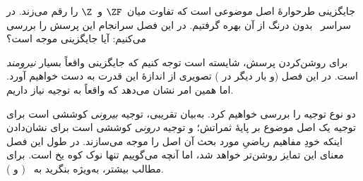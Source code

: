 \documentclass[../../../include/open-logic-section]{subfiles}
\begin{document}

جایگزینی طرحوارهٔ اصل موضوعی است که تفاوت میان~$\ZF$ و~$\Z$ را رقم
می‌زند. در سراسر~ بدون
درنگ از آن بهره گرفتیم. در این فصل سرانجام این پرسش را بررسی می‌کنیم:
آیا جایگزینی موجه است؟

برای روشن‌کردن پرسش، شایسته است توجه کنیم که جایگزینی واقعاً بسیار
\emph{نیرومند} است. در این فصل (و بار دیگر در
) تصویری از اندازهٔ این قدرت به دست
خواهیم آورد. اما همین امر نشان می‌دهد که واقعاً به توجیه نیاز داریم.

دو نوع توجیه را بررسی خواهیم کرد. به‌بیان تقریبی، توجیه \emph{بیرونی}
کوششی است برای توجیه یک اصل موضوع بر پایهٔ ثمراتش؛ و توجیه
\emph{درونی} کوششی است برای نشان‌دادن اینکه خودِ مفاهیم ریاضیِ مورد بحث
آن اصل را موجه می‌سازند. در طول این فصل معنای این تمایز روشن‌تر خواهد
شد، اما آنچه می‌گوییم تنها نوک کوه یخ است. برای مطالب بیشتر، به‌ویژه
بنگرید به~\citeauthor{Maddy1988a} (\citeyear{Maddy1988a} و
\citeyear{Maddy1988b}).
\end{document}
